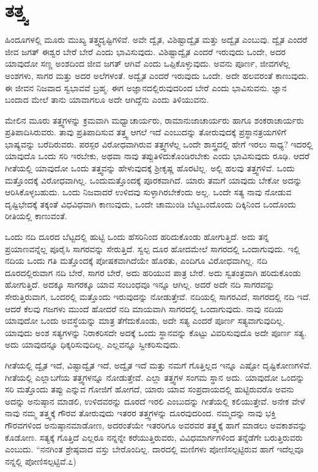 \section*{ತತ್ತ್ವ}

ಹಿಂದೂಗಳಲ್ಲಿ ಮೂರು ಮುಖ್ಯ ತತ್ತ್ವದೃಷ್ಟಿಗಳಿವೆ. ಅವೇ ದ್ವೈತ, ವಿಶಿಷ್ಟಾದ್ವೈತ ಮತ್ತು ಅದ್ವೈತ ಎಂಬುವು. ದ್ವೈತ ಎಂದರೆ ಜೀವ ಜಗತ್ ಈಶ್ವರ ಬೇರೆ ಬೇರೆ ಎಂದು ಭಾವಿಸುವುದು. ವಿಶಿಷ್ಟಾದ್ವೈತ ಎಂದರೆ ಇರುವುದು ಒಂದೇ, ಅದರ ಯಾವುದೋ ಸಣ್ಣ ಅಂಶದಿಂದ ಜೀವ ಜಗತ್ ಆಗಿವೆ ಎಂದು ಒಪ್ಪಿಕೊಳ್ಳುವುದು. ಅವನು ಪೂರ್ಣ, ಜೀವಗಳೆಲ್ಲ ಅಂಶಗಳು, ಸಾಗರ ಮತ್ತು ಅದರ ಅಲೆಗಳಂತೆ. ಅದ್ವೈತ ಎಂದರೆ ಇರುವುದು ಒಂದೇ. ಅದೇ ಹಲವರಂತೆ ಕಾಣುವುದು. ಈ ಜೀವನ ನಿಜವಾದ ಸ್ವಭಾವವೆ ಬ್ರಹ್ಮ. ಈಗ ಅಜ್ಞಾನದಲ್ಲಿರುವುದರಿಂದ ಬೇರೆ ಎಂದು ಭಾವಿಸುವನು. ಜ್ಞಾನ ಬಂದಾದ ಮೇಲೆ ತಾನು ಯಾವಾಗಲೂ ಅದೇ ಆಗಿದ್ದೆನು ಎಂದು ತಿಳಿಯುವನು.

ಮೇಲಿನ ಮೂರು ತತ್ತ್ವಗಳನ್ನು ಕ್ರಮವಾಗಿ ಮಧ್ವಾಚಾರ್ಯರು, ರಾಮಾನುಜಾಚಾರ್ಯರು ಹಾಗೂ ಶಂಕರಾಚಾರ್ಯರು ಪ್ರತಿಪಾದಿಸಿರುವರು. ತಾವು ಪ್ರತಿಪಾದಿಸುವ ತತ್ತ್ವ ಆಗಲೆ ಇದೆ ಎಂಬುದನ್ನು ತೋರುವುದಕ್ಕೆ ಪ್ರಸ್ಥಾನತ್ರಯಗಳಿಗೆ ಭಾಷ್ಯವನ್ನು ಬರೆದಿರುವರು. ಪರಸ್ಪರ ವಿರೋಧವಾಗಿರುವ ತತ್ತ್ವಗಳೆಲ್ಲ ಒಂದೇ ಶಾಸ್ತ್ರದಲ್ಲಿ ಹೇಗೆ ಇರಲು ಸಾಧ್ಯ? ಇದರಲ್ಲಿ ಯಾವುದೊ ಒಂದು ಸರಿ ಇರಬೇಕು, ಅಥವಾ ನಾವು ತಪ್ಪುತಿಳಿದುಕೊಂಡಿರಬೇಕು ಎಂದು ಭಾವಿಸುವುದು ರೂಢಿ. ಆದರೆ ಗೀತೆಯಲ್ಲಿ ಯಾವುದೋ ಒಂದು ತತ್ತ್ವವನ್ನು ಹೇಳುವುದಕ್ಕೆ ಶ‍್ರೀಕೃಷ್ಣ ಹೊರಟಿಲ್ಲ. ಅಲ್ಲಿ ಹಲವು ತತ್ತ್ವಗಳಿವೆ. ಒಂದು ಮತ್ತೊಂದಕ್ಕೆ ವಿರೋಧವಾಗಿಲ್ಲ. ಒಂದು\break ಮತ್ತೊಂದಕ್ಕೆ ಪೂರಕವಾಗಿದೆ. ಯಾರು ತಮಗೆ ಯಾವುದು ಬೇಕೋ ಅದನ್ನು ಆರಿಸಿಕೊಳ್ಳಬಹುದು. ಒಂದು ನಿಜವಾದರೆ ಉಳಿದವು ಸುಳ್ಳಾಗಿರಬೇಕೆಂದು ಅಲ್ಲ. ಒಂದೇ ಸತ್ಯ ನಾವು ನೋಡುವ ದೃಷ್ಟಿಭೇದಕ್ಕೆ ತಕ್ಕಂತೆ ವಿಧವಿಧವಾಗಿ ಕಾಣುವುದು, ಒಂದೇ ಚಾಮುಂಡಿ ಬೆಟ್ಟ\break ಒಂದೊಂದು ದಿಕ್ಕಿನಿಂದ ಒಂದೊಂದು ರೀತಿಯಲ್ಲಿ ಕಾಣುವಂತೆ.

ಒಂದು ನದಿ ದೂರದ ಬೆಟ್ಟದಲ್ಲಿ ಹುಟ್ಟಿ ಒಂದು ಹೆಸರಿನಿಂದ ಹರಿದುಕೊಂಡು ಹೋಗುತ್ತಿದೆ. ಅದು ತನ್ನ ಪ್ರಯಾಣವನ್ನೆಲ್ಲ ಪೂರೈಸಿ ಸಾಗರವನ್ನು ಸೇರುತ್ತಿದೆ. ಸ್ವಲ್ಪ ದೂರ ಹೋದಮೇಲೆ ಸಾಗರದಲ್ಲಿ ಒಂದಾಗುವುದು. ಇಲ್ಲಿ ನದಿಯ ಒಂದು ಗತಿ ಮತ್ತೊಂದಕ್ಕೆ ಪೋಷಕವಾಗಿದೆಯೇ ಹೊರತು, ಎಂದಿಗೂ ವಿರೋಧವಾಗಿಲ್ಲ. ನದಿ ದೂರದಲ್ಲಿರುವಾಗ ನದಿ ಬೇರೆ, ಸಾಗರ ಬೇರೆ, ಅದು ಹರಿಯುವ ಪಾತ್ರ ಬೇರೆ. ಅದು ಸ್ವತಂತ್ರವಾಗಿ ಹರಿದುಕೊಂಡು ಹೋಗುತ್ತಿದೆ. ಅದಕ್ಕೂ ಸಾಗರಕ್ಕೂ ಯಾವ ಸಂಬಂಧವೂ ಇನ್ನೂ ಆಗಿಲ್ಲ. ಅದರೆ ಅದೇ ನದಿ ಸಾಗರವನ್ನು ಸೇರುತ್ತಿರುವಾಗ, ಒಂದರಲ್ಲಿ ಮತ್ತೊಂದು ಇರುವುದನ್ನು ನೋಡುತ್ತೇವೆ. ನದಿಯಲ್ಲಿ ಸಾಗರವಿದೆ, ಸಾಗರದಲ್ಲಿ ನದಿ ಇದೆ. ಆದರೆ ಕೆಲವು ಗಜಗಳು ಮುಂದೆ ಹೋದರೆ ನದಿ ಮಾಯವಾಗಿ ಸಾಗರದಲ್ಲಿ ಒಂದಾಗುವುದು. ನಾವು ನದಿಯ ಯಾವುದೋ ಒಂದು ಅವಸ್ಥೆಯನ್ನು ಮಾತ್ರ ತೆಗೆದುಕೊಂಡು, ಅದೇ ಸತ್ಯ ಎಂದರೆ ಪೂರ್ಣ ಸತ್ಯವಾಗುವುದಿಲ್ಲ. ಯಾವುದು ಅಂಶ ಸತ್ಯಗಳನ್ನು ನಿರಾಕರಿಸದೇ ಅದಕ್ಕೆ ಒಂದು ಸ್ಥಾನವನ್ನು ಕೊಟ್ಟು ವಿವರಿಸುವುದೊ ಅದೇ ಪೂರ್ಣ ಸತ್ಯ. ಅದು ಯಾವುದನ್ನೂ ಧಿಕ್ಕರಿಸುವುದಿಲ್ಲ. ಎಲ್ಲವನ್ನೂ ಸ್ವೀಕರಿಸುವುದು.

ಗೀತೆಯಲ್ಲಿ ದ್ವೈತ ಇದೆ, ವಿಷ್ಟಾದ್ವೈತ ಇದೆ, ಅದ್ವೈತ ಇದೆ ಮತ್ತು ನಮಗೆ ಗೊತ್ತಿಲ್ಲದ ಇನ್ನೂ ಎಷ್ಟೋ ದೃಷ್ಟಿಕೋಣಗಳಿವೆ. ಗೀತೆಯಲ್ಲಿ ಎಲ್ಲಾಬಗೆಯ ತತ್ತ್ವಗಳನ್ನೂ ನೋಡುತ್ತೇವೆ. ಎಲ್ಲಾ ತತ್ತ್ವಗಳ ಸಂಗಮ ಸ್ಥಾನ ಅದು. ಯಾವುದೋ ಒಂದನ್ನು ಸರಿ ಮತ್ತೊಂದು ತಪ್ಪು ಎನ್ನುವ ಗೋಜಿಗೆ ಹೋಗದೆ, ಯಾರು ಯಾವ ಸಂಪ್ರದಾಯದಲ್ಲಿ ಹುಟ್ಟಿರುವರೊ ಅವನು ಅದನ್ನು ಅನುಷ್ಠಾನ ಮಾಡಲಿ, ಉಳಿದವರನ್ನು ದೂರದೆ ಇರಲಿ ಎಂಬುದನ್ನು ಗೀತೆಯಲ್ಲಿ ಕಲಿಯುತ್ತೇವೆ. ಅನೇಕ ವೇಳೆ ನಾವು ನಮ್ಮ ತತ್ತ್ವಕ್ಕೆ ಗೌರವ ತೋರುವುದು ಇತರರ ತತ್ತ್ವಗಳನ್ನು ದೂರವುದರಿಂದ. ನಮ್ಮದನ್ನು ನಾವು ಭಕ್ತಿ ಗೌರವಗಳಿಂದ ಅನುಷ್ಠಾನಮಾಡೋಣ, ಅದರಂತೆಯೇ ಇತರರಿಗೂ ಅವರವರ ತತ್ತ್ವಕ್ಕೆ ಹಾಗೆ ಮಾಡಲು ಅವಕಾಶವನ್ನು ಕೊಡೋಣ. ಸತ್ಯಕ್ಕೆ ಗೊತ್ತಿದೆ ಎಲ್ಲರೂ ನನ್ನನ್ನೇ ಕರೆಯುತ್ತಿರುವರು, ವಿವಿಧಮಾರ್ಗಗಳಿಂದ ತನ್ನೆಡೆಗೇ ಬರುತ್ತಿರುವರು ಎಂಬುದು. “ನನಗಿಂತ ಶ್ರೇಷ್ಠವಾದ ವಸ್ತು ಬೇರೊಂದಿಲ್ಲ. ದಾರದಲ್ಲಿ ಮಣಿಗಳು ಪೋಣಿಸಲ್ಪಟ್ಟಿರುವ ಹಾಗೆ ಇದೆಲ್ಲವೂ ನನ್ನಲ್ಲಿ ಪೋಣಿಸಲ್ಪಟ್ಟಿವೆ.೭)


